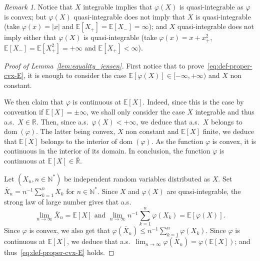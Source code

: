 \documentclass[12pt]{article}
\newcommand{\E}{{\mathbb E}}
\newcommand{\N}{{\mathbb N}}
\newcommand{\R}{{\mathbb R}}
\newcommand{\dom}{{\mathrm{dom}}\;}
\theoremstyle{plain}
\theoremstyle{remark}
\newtheorem{rem}{Remark}
\begin{document}
\begin{rem}
  \label{rem:jensen}
  Notice   that  $X$   integrable  implies   that  $\varphi(X)$   is
  quasi-integrable   as  $\varphi$   is  convex;   but  $\varphi(X)$
  quasi-integrable does not imply that $X$ is quasi-integrable (take
  $\varphi(x)=|x|$    and    $\E[X_+]=\E[X_-]=\infty$);   and    $X$
  quasi-integrable   does    not   imply either  that    $\varphi(X)$   is
  quasi-integrable (take $\varphi(x)=x+ x_+^2$,
  $\E[X_-]=\E[X^2_+]=+\infty$ and  $\E[X_+]<\infty$).
\end{rem}


\begin{proof}[Proof of Lemma~\ref{lem:equality_jensen}]
  First notice that to prove~\eqref{eq:def-proper-cvx-E}, it is
  enough to  consider the case  $\E[\varphi(X)]\in [-\infty , + \infty )$
  and   $X$   non  constant.


  We then claim  that $\varphi$ is continuous  at $\E[X]$.  Indeed,
  since this is  the case by convention if $\E[X]=\pm\infty  $, we shall
  only consider the case $X$ integrable  and thus a.s.\ $X\in \R$. Then,
  since a.s.\ $\varphi(X)<+\infty $, we deduce that a.s.\ $X$ belongs to
  $\dom(\varphi)$. The latter being convex, $X$ non constant and $\E[X]$
  finite,  we   deduce  that   $\E[X]$  belongs   to  the   interior  of
  $\dom(\varphi)$. As the function $\varphi$ is convex, it is continuous
  in  the interior  of  its  domain. In conclusion,  the  function $\varphi$  is
  continuous at $\E[X]\in \bar \R$.

 Let $(X_n, n\in \N^*)$ be independent random
  variables distributed as $X$. Set $\bar X_n=n^{-1} \sum_{k=1}^n X_k$
  for $n\in \N^*$.
  Since $X$ and $\varphi(X)$ are quasi-integrable, the
  strong law of large number gives that a.s.\ 
  $$
  \lim_{n\rightarrow \infty
  } \bar X_n= \E[X] \text{ and }\lim_{n\rightarrow \infty
  } n^{-1} \sum_{k=1}^n \varphi(X_k)= \E[\varphi(X)].
  $$
Since $\varphi$ is convex, we also get that $\varphi(\bar X_n) \leq
n^{-1} \sum_{k=1}^n \varphi(X_k)$. Since $\varphi$ is continuous at
$\E[X]$,
we deduce that a.s.\ $\lim_{n\rightarrow \infty
} \varphi(\bar X_n) = \varphi(\E[X])$;
and thus~\eqref{eq:def-proper-cvx-E}
holds.



\end{proof}
\end{document}
